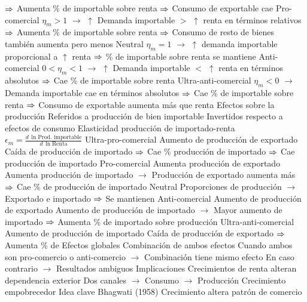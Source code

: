 \documentclass{nuevotema}
\begin{document}
\begin{esquemal}
				\4[] $\Rightarrow$ Aumenta \% de importable sobre renta
				\4[] $\Rightarrow$ Consumo de exportable cae
				\4 Pro-comercial
				\4[] $\eta_m > 1$
				\4[] $\to$ $\uparrow$ Demanda importable $>$ $\uparrow$ renta en términos relativos
				\4[] $\Rightarrow$ Aumenta \% de importable sobre renta
				\4[] $\Rightarrow$ Consumo de resto de bienes también aumenta pero menos
				\4 Neutral
				\4[] $\eta_m = 1$
				\4[] $\to$ $\uparrow$ demanda importable proporcional a $\uparrow$ renta
				\4[] $\Rightarrow$ \% de importable sobre renta se mantiene
				\4 Anti-comercial
				\4[] $0 < \eta_m < 1$
				\4[] $\to$ $\uparrow$ Demanda importable $<$ $\uparrow$ renta en términos absolutos
				\4[] $\Rightarrow$ Cae \% de importable sobre renta
				\4 Ultra-anti-comercial
				\4[] $\eta_m < 0$
				\4[] $\to$ Demanda importable cae en términos absolutos
				\4[] $\Rightarrow$ Cae \% de importable sobre renta
				\4[] $\Rightarrow$ Consumo de exportable aumenta más que renta
				\4[] 
			\3 Efectos sobre la producción
				\4 Referidos a producción de bien importable
				\4 Invertidos respecto a efectos de consumo
				\4 Elasticidad producción de importado-renta
				\4[] $\epsilon_m = \frac{d \, \ln \text{Prod. importable}}{d \, \ln \text{Renta}}$
				\4 Ultra-pro-comercial
				\4[] Aumento de producción de exportado
				\4[] Caída de producción de importado
				\4[] $\Rightarrow$ Cae \% producción de importado
				\4[] $\Rightarrow$ Cae producción de importado
				\4 Pro-comercial
				\4[] Aumenta producción de exportado
				\4[] Aumenta producción de importado
				\4[] $\to$ Producción de exportado aumenta más
				\4[] $\Rightarrow$ Cae \% de producción de importado
				\4 Neutral
				\4[] Proporciones de producción
				\4[] $\to$ Exportado e importado
				\4[] $\Rightarrow$ Se mantienen
				\4 Anti-comercial
				\4[] Aumento de producción de exportado
				\4[] Aumento de producción de importado
				\4[] $\to$ Mayor aumento de importado
				\4[] $\Rightarrow$ Aumenta \% de importado sobre producción
				\4 Ultra-anti-comercial
				\4[] Aumento de producción de importado
				\4[] Caída de producción de exportado
				\4[] $\Rightarrow$ Aumenta \% de
				\4[] 
			\3 Efectos globales
				\4 Combinación de ambos efectos
				\4 Cuando ambos son pro-comercio o anti-comercio
				\4[] $\to$ Combinación tiene mismo efecto
				\4 En caso contrario
				\4[] $\to$ Resultados ambiguos
			\3 Implicaciones
				\4[] Crecimientos de renta alteran dependencia exterior
				\4 Dos canales
				\4[] $\to$ Consumo
				\4[] $\to$ Producción
		\2 Crecimiento empobrecedor
			\3 Idea clave
				\4 Bhagwati (1958)
				\4 Crecimiento altera patrón de comercio

\end{esquemal}
\end{document}
